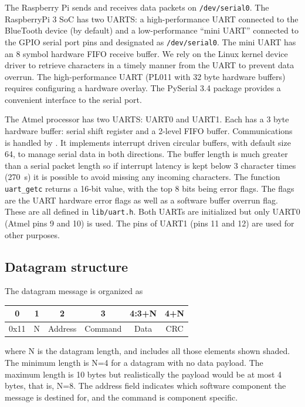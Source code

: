 \documentclass[11pt,fleqn]{article}
\begin{document}
The Raspberry Pi sends and receives data packets on \texttt{/dev/serial0}.
The RaspberryPi 3 SoC has two UARTS: a high-performance UART connected to the BlueTooth device (by default) and a low-performance
``mini UART'' connected to the GPIO serial port pins and designated as \texttt{/dev/serial0}.
The mini UART has an 8 symbol hardware FIFO receive buffer. 
We rely on the Linux kernel device driver to retrieve characters in a timely manner from the UART to prevent 
data overrun.
The high-performance UART (PL011 with 32 byte hardware buffers) requires configuring a hardware overlay.
The PySerial 3.4 package provides a convenient interface to the serial port.

The Atmel processor has two UARTS: UART0 and UART1. Each has a 3 byte hardware buffer: serial shift register and a 2-level FIFO buffer.
Communications is handled by \cite{Fleury}.  It implements interrupt driven circular buffers, with default size 64, to manage serial data in both directions.  
The buffer length is much greater than a
serial packet length so if interrupt latency is kept below 3 character times (270\unit{\mu s}) it is possible to avoid missing any incoming characters.
The function \texttt{uart\_getc} returns a 16-bit value, with the top 8 bits being error flags.  The flags are the UART hardware error flags as well as
a software buffer overrun flag.  These are all defined in \texttt{lib/uart.h}.    
Both UARTs are initialized but only UART0 (Atmel pins 9 and 10) is used. The pins of UART1 (pins 11 and 12) are used for other purposes.


\subsection{Datagram structure}

The datagram message is organized as

\begin{table}[h]
\centering
\begin{tabular}{|c|c|c|c|c|c|}\hline
0 & 1 & 2 & 3 & 4:3+N & 4+N \\ \hline
0x11 & \cellcolor[gray]{0.8} N &  \cellcolor[gray]{0.8}Address &  \cellcolor[gray]{0.8}Command &  \cellcolor[gray]{0.8}Data &  \cellcolor[gray]{0.8}CRC \\ \hline
\end{tabular}
\end{table}

where N is the datagram length, and includes all those elements shown shaded. The minimum length is N=4 for a datagram with no data payload.
The maximum length is 10 bytes but realistically the payload would be at most 4 bytes, that is, N=8. 
The address field indicates which software component the message is destined for, and the command is component specific. 
\end{document}
